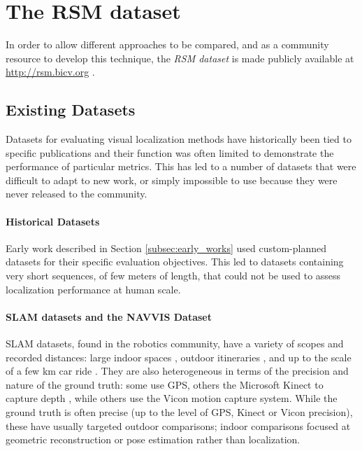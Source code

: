 \section{The RSM dataset}
\label{sec:Dataset}
In order to allow different approaches to be compared, and as a community resource to develop this technique, the \textit{RSM dataset} is made publicly available at \url{http://rsm.bicv.org} \cite{Rivera-Rubio2014}.


\subsection{Existing Datasets}

Datasets for evaluating visual localization methods have historically been tied to specific publications and their function was often limited to demonstrate the performance of particular metrics. This has led to a number of datasets that were difficult to adapt to new work, or simply impossible to use because they were never released to the community.

\paragraph{Historical Datasets}

Early work described in Section \ref{subsec:early_works} used custom-planned datasets for their specific evaluation objectives. This led to datasets \cite{Matsumoto1996,Ohno1996,Tang2001} containing very short sequences, of few meters of length, that could not be used to assess localization performance at human scale.

\paragraph{SLAM datasets and the NAVVIS Dataset}

SLAM datasets, found in the robotics community, have a variety of scopes and recorded distances: large indoor spaces \cite{sturm12iros}, outdoor itineraries \cite{Bosse2004}, and up to the scale of a few km car ride \cite{Simpson2011}. They are also heterogeneous in terms of the precision and nature of the ground truth: some use GPS, others the Microsoft Kinect to capture depth \cite{sturm12iros}, while others use the Vicon motion capture system. While the ground truth is often precise (up to the level of GPS, Kinect or Vicon precision), these have usually targeted outdoor comparisons; indoor comparisons focused at geometric reconstruction or pose estimation rather than localization.

